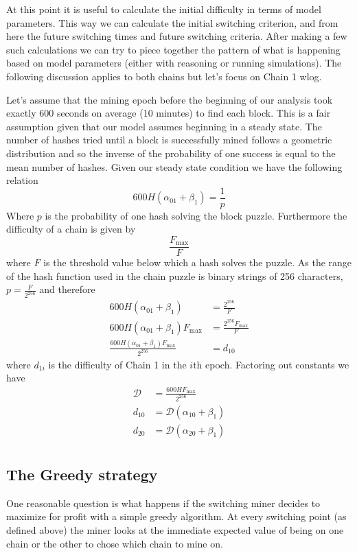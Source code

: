 \documentclass[12pt]{article}
\begin{document}
At this point it is useful to calculate the initial difficulty in terms of model parameters.  This way we can calculate the initial switching criterion, and from here the future switching times and future switching criteria.  After making a few such calculations we can try to piece together the pattern of what is happening based on model parameters (either with reasoning or running simulations).  The following discussion applies to both chains but let's focus on Chain 1 wlog.

Let's assume that the mining epoch before the beginning of our analysis took exactly 600 seconds on average (10 minutes) to find each block.  This is a fair assumption given that our model assumes beginning in a steady state.  The number of hashes tried until a block is successfully mined follows a geometric distribution and so the inverse of the probability of one success is equal to the mean number of hashes.  Given our steady state condition we have the following relation
$$
600 H(\alpha_{01} + \beta_1) = \frac{1}{p}
$$
Where $p$ is the probability of one hash solving the block puzzle.
Furthermore the difficulty of a chain is given by
$$
\frac{F_{\text{max}}}{F}
$$
where $F$ is the threshold value below which a hash solves the puzzle.  As the range of the hash function used in the chain puzzle is binary strings of 256 characters, $p = \frac{F}{2^{256}}$ and therefore
\begin{align*}
600 H(\alpha_{01} + \beta_1) &= \frac{2^{256}}{F}\\
600 H(\alpha_{01} + \beta_1)F_{\text{max}} &= \frac{2^{256}F_{\text{max}}}{F}\\
\frac{600 H(\alpha_{01} + \beta_1)F_{\text{max}} }{2^{256}} &= d_{10}
\end{align*}
where $d_{1i}$ is the difficulty of Chain 1 in the $i$th epoch.  Factoring out constants we have
\begin{align*}
\mathcal{D} &= \frac{600 HF_{\text{max}} }{2^{256}}\\
d_{10} &= \mathcal{D} (\alpha_{10} + \beta_1)\\
d_{20} &= \mathcal{D} (\alpha_{20} + \beta_1)\\
\end{align*}

\subsection*{The Greedy strategy}
One reasonable question is what happens if the switching miner decides to maximize for profit with a simple greedy algorithm.  At every switching point (as defined above) the miner looks at the immediate expected value of being on one chain or the other to chose which chain to mine on.
\end{document}
